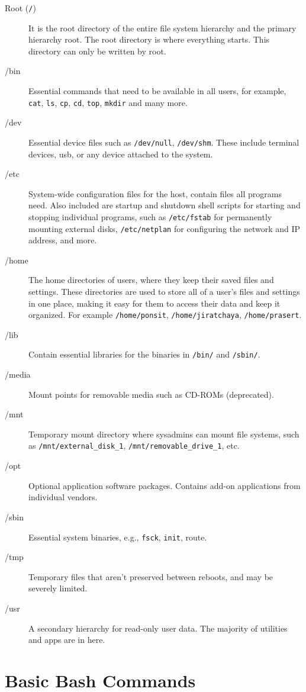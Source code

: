\documentclass[
  letterpaper,
  DIV=11,
  numbers=noendperiod]{scrreprt}
\begin{document}
\begin{description}
\item[Root (\texttt{/})]
It is the root directory of the entire file system hierarchy and the
primary hierarchy root. The root directory is where everything starts.
This directory can only be written by root.
\item[/bin]
Essential commands that need to be available in all users, for example,
\texttt{cat}, \texttt{ls}, \texttt{cp}, \texttt{cd}, \texttt{top},
\texttt{mkdir} and many more.
\item[/dev]
Essential device files such as \texttt{/dev/null}, \texttt{/dev/shm}.
These include terminal devices, usb, or any device attached to the
system.
\item[/etc]
System-wide configuration files for the host, contain files all programs
need. Also included are startup and shutdown shell scripts for starting
and stopping individual programs, such as \texttt{/etc/fstab} for
permanently mounting external disks, \texttt{/etc/netplan} for
configuring the network and IP address, and more.
\item[/home]
The home directories of users, where they keep their saved files and
settings. These directories are used to store all of a user's files and
settings in one place, making it easy for them to access their data and
keep it organized. For example \texttt{/home/ponsit},
\texttt{/home/jiratchaya}, \texttt{/home/prasert}.
\item[/lib]
Contain essential libraries for the binaries in \texttt{/bin/} and
\texttt{/sbin/}.
\item[/media]
Mount points for removable media such as CD-ROMs (deprecated).
\item[/mnt]
Temporary mount directory where sysadmins can mount file systems, such
as \texttt{/mnt/external\_disk\_1}, \texttt{/mnt/removable\_drive\_1},
etc.
\item[/opt]
Optional application software packages. Contains add-on applications
from individual vendors.
\item[/sbin]
Essential system binaries, e.g., \texttt{fsck}, \texttt{init}, route.
\item[/tmp]
Temporary files that aren't preserved between reboots, and may be
severely limited.
\item[/usr]
A secondary hierarchy for read-only user data. The majority of utilities
and apps are in here.
\end{description}

\hypertarget{basic-bash-commands}{%
\section{Basic Bash Commands}\label{basic-bash-commands}}
\end{document}
